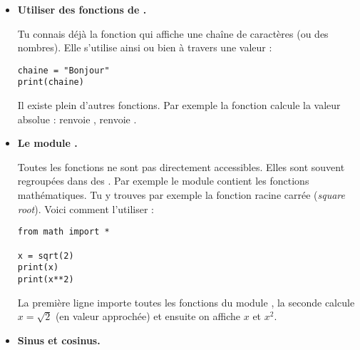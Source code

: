 \documentclass[11pt,class=report,crop=false]{standalone}
\begin{document}
\begin{cours}
\sauteligne
\begin{itemize}
  \item \textbf{Utiliser des fonctions de \Python.}
  
  Tu connais déjà la fonction  qui affiche une chaîne de caractères (ou des nombres). Elle s'utilise ainsi  ou bien à travers une valeur : 
\begin{center}
\begin{minipage}{0.5\textwidth}
\begin{lstlisting}  
chaine = "Bonjour"
print(chaine)
\end{lstlisting}
\end{minipage}
\end{center} 	 

  Il existe plein d'autres fonctions. Par exemple la fonction  calcule la valeur absolue :  renvoie ,  renvoie .

  \item \textbf{Le module .}

	Toutes les fonctions ne sont pas directement accessibles. Elles sont souvent regroupées dans des . Par exemple le module  contient les fonctions mathématiques. Tu y trouves par exemple la fonction racine carrée  (\emph{square root}). Voici comment l'utiliser : 
\begin{center}
\begin{minipage}{0.5\textwidth}
\begin{lstlisting} 
from math import *

x = sqrt(2)
print(x)
print(x**2)
\end{lstlisting}
\end{minipage}

\end{center} 	

La première ligne importe toutes les fonctions du module , la seconde calcule $x = \sqrt{2}$ (en valeur approchée) et ensuite on affiche $x$ et $x^2$.	
  \item \textbf{Sinus et cosinus.} 
  

\end{itemize}
\end{cours}
\end{document}
